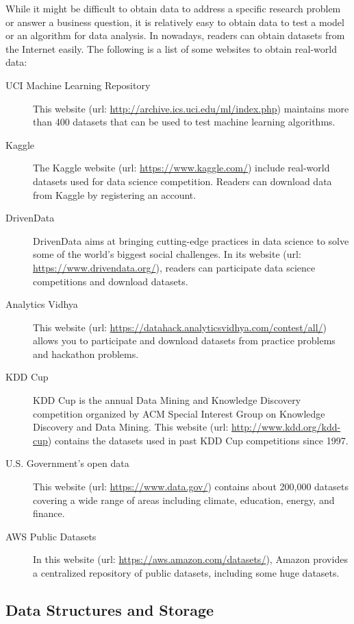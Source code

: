 \documentclass[12pt]{article}
\begin{document}
While it might be difficult to obtain data to address a specific research problem or answer a business question, it is relatively easy to obtain data to test a model or an algorithm for data analysis. In nowadays, readers can obtain datasets from the Internet easily. The following is a list of some websites to obtain real-world data:
\begin{description}
\item[UCI Machine Learning Repository] This website (url: \url{http://archive.ics.uci.edu/ml/index.php}) maintains more than 400 datasets that can be used to test machine learning algorithms.
\item[Kaggle] The Kaggle website (url: \url{https://www.kaggle.com/}) include real-world datasets used for data science competition. Readers can download data from Kaggle by registering an account.
\item[DrivenData] DrivenData aims at bringing cutting-edge practices in data science to solve some of the world's biggest social challenges. In its website (url: \url{https://www.drivendata.org/}), readers can participate data science competitions and download datasets.
\item[Analytics Vidhya] This website (url: \url{https://datahack.analyticsvidhya.com/contest/all/}) allows you to participate and download datasets from practice problems and hackathon problems. 
\item[KDD Cup] KDD Cup is the annual Data Mining and Knowledge Discovery competition organized by ACM Special Interest Group on Knowledge Discovery and Data Mining. This website (url: \url{http://www.kdd.org/kdd-cup}) contains the datasets used in past KDD Cup competitions since 1997.
\item[U.S. Government's open data] This website (url: \url{https://www.data.gov/}) contains about 200,000 datasets covering a wide range of areas including climate, education, energy, and finance.
\item[AWS Public Datasets] In this website (url: \url{https://aws.amazon.com/datasets/}), Amazon provides a centralized repository of public datasets, including some huge datasets.
\end{description}


\subsection{Data Structures and Storage}
\end{document}
